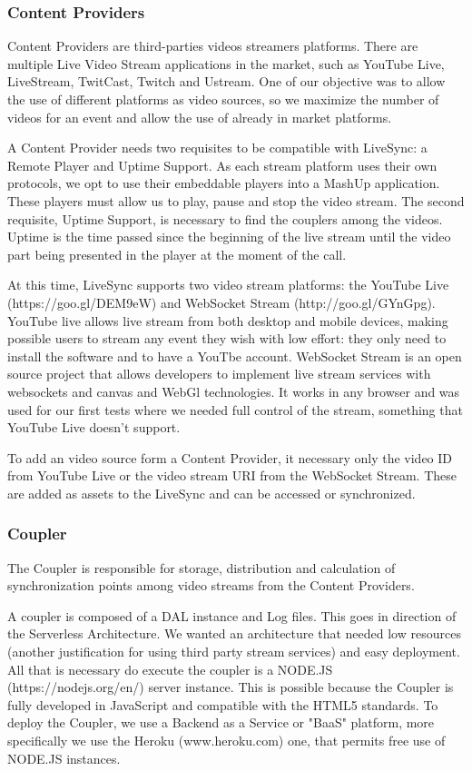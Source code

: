 \documentclass[jidm,a4paper]{jidm} %
\begin{document}
\subsubsection{Content Providers}
Content Providers are third-parties videos streamers platforms. There are multiple Live Video Stream applications in the market, such as YouTube Live, LiveStream, TwitCast, Twitch and Ustream. One of our objective was to allow the use of different platforms as video sources, so we maximize the number of videos for an event and allow the use of already in market platforms. 

A Content Provider needs two requisites to be compatible with LiveSync: a Remote Player and Uptime Support. As each stream platform uses their own protocols, we opt to use their embeddable players into a MashUp application. These players must allow us to play, pause and stop the video stream. The second requisite, Uptime Support, is necessary to find the couplers among the videos. Uptime is the time passed since the beginning of the live stream until the video part being presented in the player at the moment of the call.

At this time, LiveSync supports two video stream platforms: the YouTube Live (https://goo.gl/DEM9eW) and WebSocket Stream (http://goo.gl/GYnGpg). YouTube live allows live stream from both desktop and mobile devices, making possible users to stream any event they wish with low effort: they only need to install the software and to have a YouTbe account. WebSocket Stream is an open source project that allows developers to implement live stream services with websockets and canvas and WebGl technologies. It works in any browser and was used for our first tests where we needed full control of the stream, something that YouTube Live doesn't support.

To add an video source form a Content Provider, it necessary only the video ID from YouTube Live or the video stream URI from the WebSocket Stream. These are added as assets to the LiveSync and can be accessed or synchronized.

\subsubsection{Coupler}
The Coupler is responsible for storage, distribution and calculation of synchronization points among video streams from the Content Providers.

A coupler is composed of a DAL instance and Log files. This goes in direction of the Serverless Architecture. We wanted an architecture that needed low resources (another justification for using third party stream services) and easy deployment. All that is necessary do execute the coupler is a NODE.JS (https://nodejs.org/en/) server instance. This is possible because the Coupler is fully developed in JavaScript and compatible with the HTML5 standards. To deploy the Coupler, we use a Backend as a Service or "BaaS" platform, more specifically we use the Heroku (www.heroku.com) one, that permits free use of NODE.JS instances.
\end{document}
